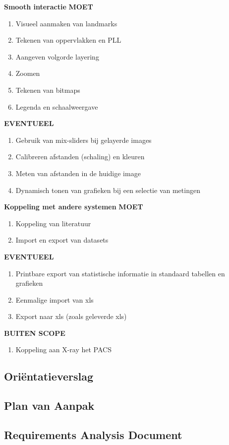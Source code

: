 \Large{\textbf{Smooth interactie}}
\large{\textbf{MOET}}
\begin{enumerate}
	\item Visueel aanmaken van landmarks
	\item Tekenen van oppervlakken en PLL
	\item Aangeven volgorde layering
	\item Zoomen
	\item Tekenen van bitmaps
	\item Legenda en schaalweergave
\end{enumerate}
\large{\textbf{EVENTUEEL}}
\begin{enumerate}
	\item Gebruik van mix-sliders bij gelayerde images
	\item Calibreren afstanden (schaling) en kleuren
	\item Meten van afstanden in de huidige image
	\item Dynamisch tonen van grafieken bij een selectie van metingen
\end{enumerate}

\Large{\textbf{Koppeling met andere systemen}}
\large{\textbf{MOET}}
\begin{enumerate}
	\item Koppeling van literatuur
	\item Import en export van datasets
\end{enumerate}
\large{\textbf{EVENTUEEL}}
\begin{enumerate}
	\item Printbare export van statistische informatie in standaard tabellen en grafieken
	\item Eenmalige import van xls
	\item Export naar xls (zoals geleverde xls)
\end{enumerate}
\large{\textbf{BUITEN SCOPE}}
\begin{enumerate}
	\item Koppeling aan X-ray het PACS
\end{enumerate}

\subsection{Ori\"{e}ntatieverslag}
\label{Orientatieverslag}

\subsection{Plan van Aanpak}
\label{PvA}

\subsection{Requirements Analysis Document}
\label{RAD}
